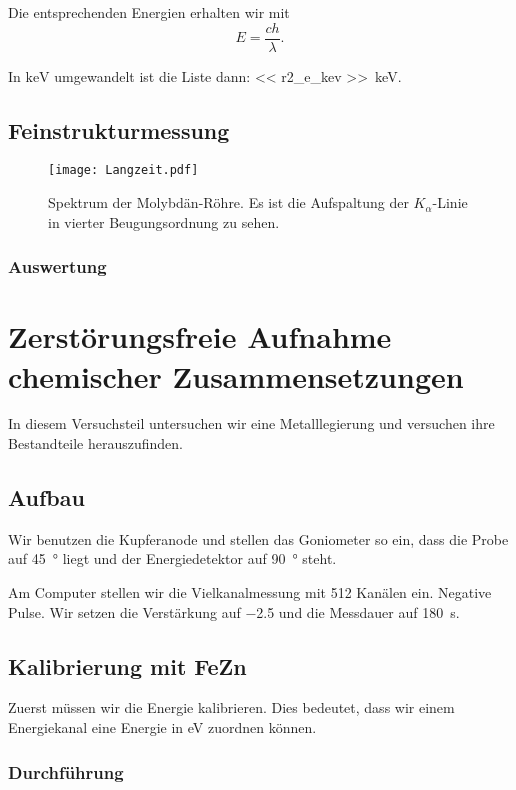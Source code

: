 Die entsprechenden Energien erhalten wir mit
\[
    E = \frac{c h}{\lambda}.
\]

In $\si{\kilo\electronvolt}$ umgewandelt ist die Liste dann: \SIlist{<<
r2_e_kev >>}{\kilo\electronvolt}.


\section{Feinstrukturmessung}

\begin{figure}[htbp]
    \centering
    \texttt{[image: Langzeit.pdf]}
    \caption{%
        Spektrum der Molybdän-Röhre. Es ist die Aufspaltung der
        $K_\alpha$-Linie in vierter Beugungsordnung zu sehen.
    }
    \label{fig:}
\end{figure}

\subsection{Auswertung}

\chapter{Zerstörungsfreie Aufnahme chemischer Zusammensetzungen}

In diesem Versuchsteil untersuchen wir eine Metalllegierung und versuchen ihre
Bestandteile herauszufinden.

\section{Aufbau}

Wir benutzen die Kupferanode und stellen das Goniometer so ein, dass die Probe
auf \SI{45}{\degree} liegt und der Energiedetektor auf \SI{90}{\degree} steht.

Am Computer stellen wir die Vielkanalmessung mit 512 Kanälen ein. Negative
Pulse. Wir setzen die Verstärkung auf \num{-2.5} und die Messdauer auf
\SI{180}{\second}.

\section{Kalibrierung mit FeZn}

Zuerst müssen wir die Energie kalibrieren. Dies bedeutet, dass wir einem
Energiekanal eine Energie in \si{\electronvolt} zuordnen können.

\subsection{Durchführung}

